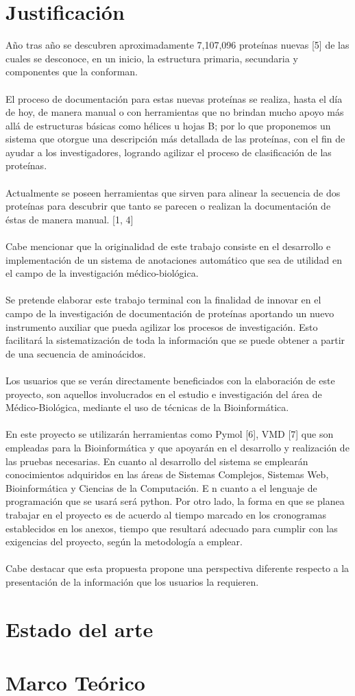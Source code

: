 \documentclass{article}
\begin{document}
\section{Justificación} 
Año tras año se descubren aproximadamente 7,107,096 proteínas nuevas [5] de las cuales se desconoce, en un inicio, la estructura primaria, secundaria y componentes que la conforman.\\\\
El proceso de documentación para estas nuevas proteínas se realiza, hasta el día de hoy, de manera manual o con herramientas que no brindan mucho apoyo más allá de estructuras básicas como hélices u hojas B; por lo que proponemos un sistema que otorgue una descripción más detallada de las proteínas, con el fin de ayudar a los investigadores, logrando agilizar el proceso de clasificación de las proteínas.\\\\
Actualmente se poseen herramientas que sirven para alinear la secuencia de dos proteínas para descubrir que tanto se parecen o realizan la documentación de éstas de manera manual. [1, 4]\\\\
Cabe mencionar que la originalidad de este trabajo consiste en el desarrollo e implementación de un sistema de anotaciones automático que sea de utilidad en el campo de la investigación médico-biológica.\\\\
Se pretende elaborar este trabajo terminal con la finalidad de innovar en el campo de la investigación de documentación de proteínas aportando un nuevo instrumento auxiliar que pueda agilizar los procesos de investigación. Esto facilitará la sistematización de toda la información que se puede obtener a partir de una secuencia de aminoácidos.\\\\
Los usuarios que se verán directamente beneficiados con la elaboración de este proyecto, son aquellos involucrados en el estudio e investigación del área de Médico-Biológica, mediante el uso de técnicas de la Bioinformática.\\\\
En este proyecto se utilizarán herramientas como Pymol [6], VMD [7] que son empleadas para la Bioinformática y que apoyarán en el desarrollo y realización de las pruebas necesarias. En cuanto al desarrollo del sistema se emplearán conocimientos adquiridos en las áreas de Sistemas Complejos, Sistemas Web, Bioinformática y Ciencias de la Computación. E n cuanto a el lenguaje de programación que se usará será python. Por otro lado, la forma en que se planea trabajar en el proyecto es de acuerdo al tiempo marcado en los cronogramas establecidos en los anexos, tiempo que resultará adecuado para cumplir con las exigencias del proyecto, según la metodología a emplear.\\\\
Cabe destacar que esta propuesta propone una perspectiva diferente respecto a la presentación de la información que los usuarios la requieren.
\section{Estado del arte}
\section{Marco Teórico} 
%
%
\end{document}
